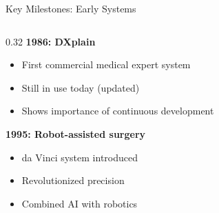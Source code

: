 \documentclass[aspectratio=169, 10pt]{beamer}
\begin{document}
\begin{frame}{Key Milestones: Early Systems}
\begin{columns}
        \begin{column}{0.32\textwidth}
            \textbf{1986: DXplain}
            \begin{itemize}
                \item First commercial medical expert system
                \item Still in use today (updated)
                \item Shows importance of continuous development
            \end{itemize}

            \vspace{2mm}
            \textbf{1995: Robot-assisted surgery}
            \begin{itemize}
                \item da Vinci system introduced
                \item Revolutionized precision
                \item Combined AI with robotics
            \end{itemize}
        \end{column}
    \end{columns}

\end{frame}
\end{document}
